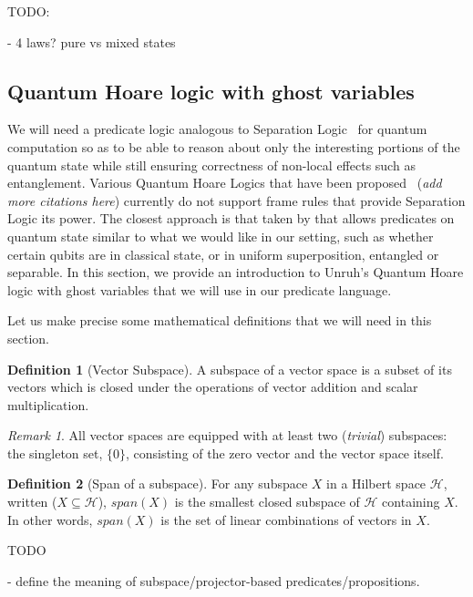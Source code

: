\documentclass[adraft,creativecommons]{eptcs}
\theoremstyle{definition}
\newtheorem{definition}{Definition}[section]
\theoremstyle{remark}
\newtheorem*{remark}{Remark}
\begin{document}
TODO:

- 4 laws? pure vs mixed states

\subsection{Quantum Hoare logic with ghost variables}

We will need a predicate logic analogous to Separation Logic~\cite{reynolds2002} for quantum computation so as to be able to reason about only the interesting portions of the quantum state while still ensuring correctness of non-local effects such as entanglement. Various Quantum Hoare Logics that have been proposed~\cite{floydhoare2012} (\textit{add more citations here}) currently do not support frame rules that provide Separation Logic its power. The closest approach is that taken by \cite{unruh2019} that allows predicates on quantum state similar to what we would like in our setting, such as whether certain qubits are in classical state, or in uniform superposition, entangled or separable. In this section, we provide an introduction to Unruh's Quantum Hoare logic with ghost variables that we will use in our predicate language.

Let us make precise some mathematical definitions that we will need in this section.

\begin{definition}[Vector Subspace]
	A subspace of a vector space is a subset of its vectors which is closed under the operations of vector addition and scalar multiplication.
\end{definition}

\begin{remark}
    All vector spaces are equipped with at least two (\textit{trivial}) subspaces: the singleton set, $\{ 0 \}$, consisting of the zero vector and the vector space itself.
\end{remark}

\begin{definition}[Span of a subspace]
	For any subspace $X$ in a Hilbert space $\mathcal{H}$, written ($X \subseteq \mathcal{H}$), $\mathit{span}(X)$ is the smallest closed subspace of $\mathcal{H}$ containing $X$. In other words, $\mathit{span}(X)$ is the set of linear combinations of vectors in $X$.
\end{definition}

TODO

- define the meaning of subspace/projector-based predicates/propositions.
\end{document}
